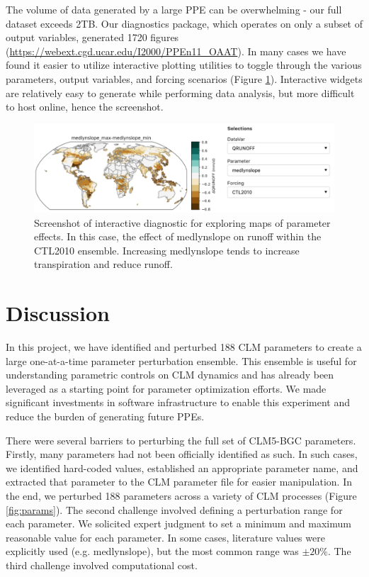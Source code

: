 \documentclass[draft]{agujournal2019}
\begin{document}
The volume of data generated by a large PPE can be overwhelming - our full dataset exceeds 2TB.  Our diagnostics package, which operates on only a subset of output variables, generated 1720 figures (\url{https://webext.cgd.ucar.edu/I2000/PPEn11_OAAT}). In many cases we have found it easier to utilize interactive plotting utilities to toggle through the various parameters, output variables, and forcing scenarios (Figure \ref{fig:panel}). Interactive widgets are relatively easy to generate while performing data analysis, but more difficult to host online, hence the screenshot.

\begin{figure}[h]
\centering
\includegraphics[width=40pc]{../figs/deltmap_panel.pdf}
\caption{Screenshot of interactive diagnostic for exploring maps of parameter effects. In this case, the effect of medlynslope on runoff within the CTL2010 ensemble. Increasing medlynslope tends to increase transpiration and reduce runoff.}
\label{fig:panel}
\end{figure}

\section{Discussion}

In this project, we have identified and perturbed 188 CLM parameters to create a large one-at-a-time parameter perturbation ensemble. This ensemble is useful for understanding parametric controls on CLM dynamics and has already been leveraged as a starting point for parameter optimization efforts. We made significant investments in software infrastructure to enable this experiment and reduce the burden of generating future PPEs.

There were several barriers to perturbing the full set of CLM5-BGC parameters. Firstly, many parameters had not been officially identified as such. In such cases, we identified hard-coded values, established an appropriate parameter name, and extracted that parameter to the CLM parameter file for easier manipulation. In the end, we perturbed 188 parameters across a variety of CLM processes (Figure \ref{fig:params}). The second challenge involved defining a perturbation range for each parameter. We solicited expert judgment to set a minimum and maximum reasonable value for each parameter. In some cases, literature values were explicitly used (e.g. medlynslope), but the most common range was $\pm20\%$. The third challenge involved computational cost.
\end{document}
